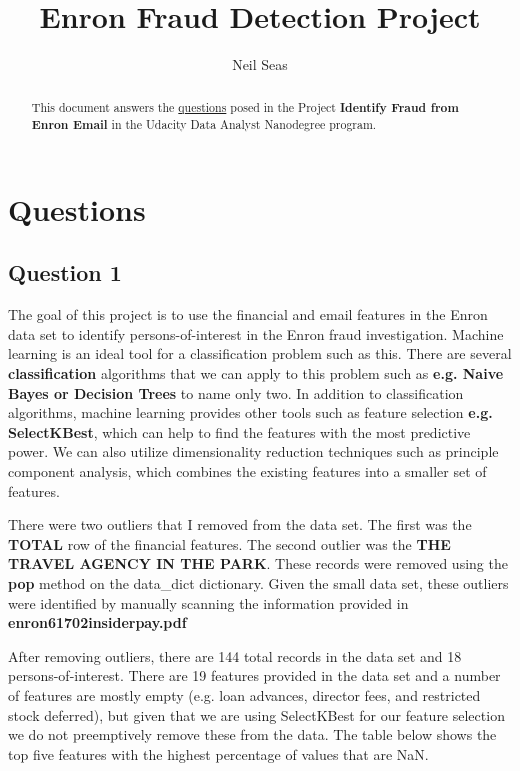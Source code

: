 \documentclass[a4paper,11pt]{report}
\title{Enron Fraud Detection Project}
\author{Neil Seas}
\begin{document}
\maketitle
\tableofcontents

\begin{abstract}
This document answers the
    \href{https://docs.google.com/document/d/1NDgi1PrNJP7WTbfSUuRUnz8yzs5nGVTSzpO7oeNTEWA/pub?embedded=true}{questions}
    posed in the Project \textbf{Identify Fraud from Enron Email} in the Udacity Data Analyst Nanodegree program.
\end{abstract}

\chapter{Questions}
\section{Question 1}

The goal of this project is to use the financial and email features in the Enron
data set to identify persons-of-interest in the Enron fraud investigation.
Machine learning is an ideal tool for a classification problem such as
this.  There are several \textbf{classification} algorithms that we can apply to
this problem such as \textbf{e.g. Naive Bayes or Decision Trees} to name only two.
In addition to classification algorithms, machine learning provides other tools
such as feature selection \textbf{e.g. SelectKBest}, which can help to find the features
with the most predictive power.  We can also utilize dimensionality reduction
techniques such as principle component analysis, which combines the existing
features into a smaller set of features.

There were two outliers that I removed from the data set.  The first was the
\textbf{TOTAL} row of the financial features.  The second outlier was the
\textbf{THE TRAVEL AGENCY IN THE PARK}.  These records were removed using the
\textbf{pop} method on the data\_dict dictionary.  Given the small data set, these
outliers were identified by manually scanning the information provided in
\textbf{enron61702insiderpay.pdf}

After removing outliers, there are 144 total records in the data set and 18
persons-of-interest.  There are 19 features provided in the data set and a
number of features are mostly empty (e.g.
loan advances, director fees, and restricted stock deferred), but given that we
are using SelectKBest for our feature selection we do not preemptively remove
these from the data.  The table below shows the top five features with the
highest percentage of values that are NaN.
\end{document}
